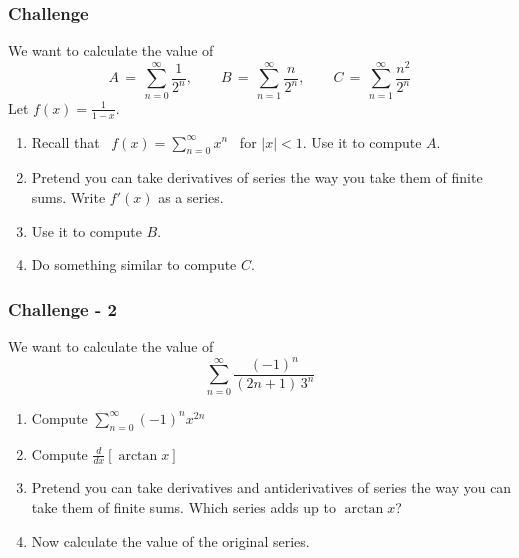 \documentclass[14pt]{beamer}
\newcommand{\setsize}[1]{\fontsize{#1}{#1}\selectfont} %
\newcommand{\smallerfont}{\setsize{13}} %
\newcommand{\vvv}{\vspace{.2cm}}
\begin{document}
	\begin{frame}[t]
		\smallerfont
		\frametitle{Challenge}

		We want to calculate the value of
		\[
			A \, = \, \sum_{n=0}^{\infty}\frac{1}{2^{n}}, \quad \quad B \, = \, \sum_{n=1}
			^{\infty}\frac{n}{2^{n}}, \quad \quad C \, = \, \sum_{n=1}^{\infty}\frac{n^{2}}{2^{n}}
		\]
		Let ${\displaystyle f(x)= \frac{1}{1-x}}$.

		\hrulefill

		\begin{enumerate}
			\item Recall that \, ${\displaystyle f(x) = \sum_{n=0}^{\infty} x^n}$ \, for
				${\displaystyle |x|<1}$. Use it to compute $A$.

			\item Pretend you can take derivatives of series the way you take them of finite
				sums. Write ${\displaystyle f'(x)}$ as a series. \vvv

			\item Use it to compute $B$. \vvv

			\item Do something similar to compute $C$.
		\end{enumerate}
	\end{frame}
	\begin{frame}[t]
		\smallerfont
		\frametitle{Challenge - 2}

		We want to calculate the value of
		\[
			\sum_{n=0}^{\infty}\frac{(-1)^{n}}{(2n+1) \, 3^{n} }
		\]

		\hrulefill

		\begin{enumerate}
			\item Compute ${\displaystyle \sum_{n=0}^{\infty} (-1)^n x^{2n}}$

			\item Compute ${\displaystyle \frac{d}{dx} \left[ \arctan x \right]}$ \vvv

			\item Pretend you can take derivatives and antiderivatives of series the way
				you can take them of finite sums. Which series adds up to
				${\displaystyle \arctan x}$? \vvv

			\item Now calculate the value of the original series.
		\end{enumerate}
	\end{frame}
\end{document}
